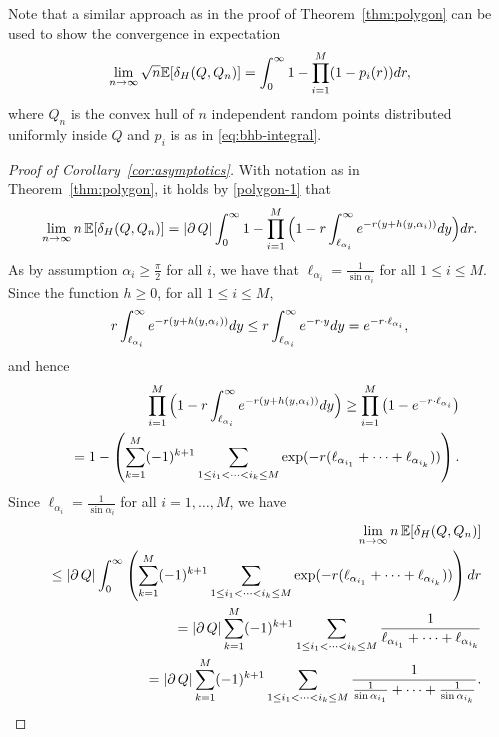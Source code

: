 \documentclass[10pt,a4paper]{amsart}
\newcommand{\IE}{\mathbb{E}}
\newcommand{\dd}{{\rm d}}
\begin{document}
\begin{remark}
	Note that a similar approach as in the proof of Theorem~\ref{thm:polygon} can be used to show the convergence in expectation
\[
\lim_{n\to\infty} \sqrt{n}\IE[\delta_{H}(Q,Q_{n})]
=\int_0^{\infty}1-\prod_{i=1}^{M}(1-p_{i}(r))\dd r,
\]
where $Q_n$ is the convex hull of $n$ independent random points distributed uniformly inside $Q$ and $p_i$ is as in \eqref{eq:bhb-integral}. 
\end{remark}

\begin{proof}[Proof of Corollary~\ref{cor:asymptotics}]
	With notation as in Theorem~\ref{thm:polygon}, it holds by \eqref{polygon-1} that
\begin{eqnarray*}
\lim_{n\to\infty}n \, \IE[\delta_H(Q,Q_n)]
	= \left| \partial \, Q \right| \int_{0}^{\infty}1-\prod_{i=1}^M\Big(1-r\int_{\ell_{\alpha_i}}^{\infty}e^{-r(y+h(y,\alpha_i))}\dd y\Big)\dd r.
\end{eqnarray*}
As by assumption $\alpha_i\ge \frac{\pi}{2}$ for all $i$, we have that  $\ell_{\alpha_i}=\frac{1}{\sin \alpha_i}$ for all $1\leq i\leq M$. Since the function $h \geq 0$, for all $1\leq i \leq M$,
$$
	r\int_{\ell_{\alpha_i}}^{\infty}e^{-r(y+h(y,\alpha_i))}\dd y
	\leq r\int_{\ell_{\alpha_i}}^{\infty}e^{-r\cdot y}\dd y
	=e^{-r\cdot \ell_{\alpha_i}},
$$
and hence
\begin{eqnarray*}
&&\prod_{i=1}^M\Big(1-r\int_{\ell_{\alpha_i}}^{\infty}e^{-r(y+h(y,\alpha_i))}\dd y\Big)
\geq \prod_{i=1}^M\big(1-e^{-r\cdot \ell_{\alpha_{i}}}\big)
\\
&&=1-\left(\sum_{k=1}^{M}(-1)^{k+1}\sum_{1\leq i_{1}<\cdots<i_{k}\leq M}
\exp(-r(\ell_{\alpha_{i_{1}}}+\cdots+\ell_{\alpha_{i_{k}}}))
\right).
\end{eqnarray*}
Since $\ell_{\alpha_i}=\frac{1}{\sin \alpha_i}$ for all $i=1,\dots,M$, we have
\begin{eqnarray*}
&&\lim_{n\to\infty}n \, \IE[\delta_H(Q,Q_n)]
\\
&&\leq\left| \partial \, Q \right| \int_{0}^{\infty}
\left(\sum_{k=1}^{M}(-1)^{k+1}\sum_{1\leq i_{1}<\cdots<i_{k}\leq M}
\exp(-r(\ell_{\alpha_{i_{1}}}+\cdots+\ell_{\alpha_{i_{k}}}))
\right)\dd r
\\
&&=\left| \partial \, Q \right| 
\sum_{k=1}^{M}(-1)^{k+1}\sum_{1\leq i_{1}<\cdots<i_{k}\leq M}
\frac{1}{\ell_{\alpha_{i_{1}}}+\cdots+\ell_{\alpha_{i_{k}}}}
\\
&&=\left| \partial \, Q \right|
\sum_{k=1}^{M}(-1)^{k+1}\sum_{1\leq i_{1}<\cdots <i_{k}\leq M}
\frac{1}{\frac{1}{\sin\alpha_{i_{1}}}+\cdots+\frac{1}{\sin\alpha_{i_{k}}}}.

\end{eqnarray*}
\end{proof}
\end{document}
